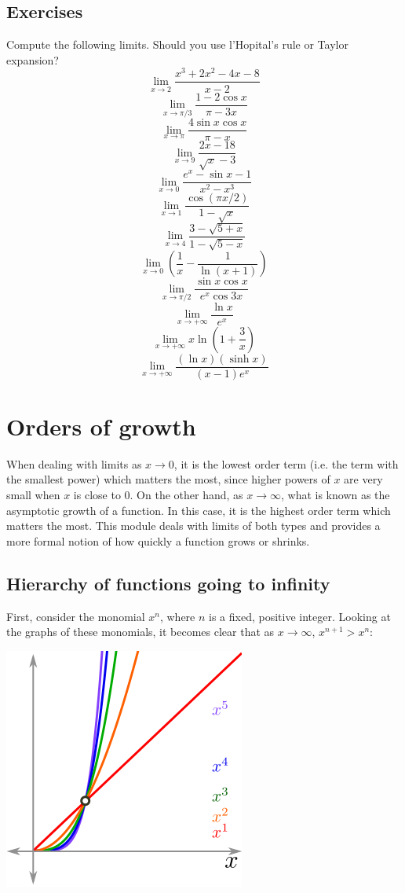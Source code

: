 \documentclass[a4paper]{book}
\begin{document}
\begin{sloppypar}
\subsection{Exercises}
Compute the following limits. Should you use l'Hopital's rule or Taylor expansion?
\[\displaystyle \lim_{x \to 2} \frac{x^3+2x^2-4x-8}{x-2} \]
\[\displaystyle \lim_{x \to \pi/3} \frac{1-2\cos x}{\pi -3x} \]
\[\displaystyle \lim_{x \to \pi} \frac{4 \sin x \cos x}{\pi - x} \]
\[\displaystyle \lim_{x \to 9} \frac{2x-18}{\sqrt{x}-3} \]
\[\displaystyle \lim_{x \to 0} \frac{e^x - \sin x -1}{x^2-x^3} \]
\[\displaystyle \lim_{x \to 1} \frac{\cos (\pi x/2)}{1 - \sqrt{x}} \]
\[\displaystyle \lim_{x \to 4} \frac{3 - \sqrt{5+x}}{1 - \sqrt{5-x}} \]
\[\displaystyle \lim_{x\rightarrow 0} \left(\frac{1}{x}-\frac{1}{\ln (x+1)}\right) \]
\[\displaystyle \lim_{x \to \pi/2} \frac{\sin x \cos x}{e^x\cos 3x} \]
\[\displaystyle \lim_{x \rightarrow +\infty} \frac {\ln x}{e^x} \]
\[\displaystyle \lim_{x \to +\infty} x \ln\left(1+ \frac{3}{x}\right) \]
\[\displaystyle \lim_{x \to +\infty} \frac{(\ln x)(\sinh x)}{(x-1)e^x} \]

\section{Orders of growth} \label{ChFunctionsSecOrdersOfGrowth}
When dealing with limits as $x\rightarrow 0$, it is the lowest order term (i.e. the term with the smallest power) which matters the most, since higher powers of $x$ are very small when $x$ is close to 0. On the other hand, as $x \rightarrow \infty$, what is known as the asymptotic growth of a function. In this case, it is the highest order term which matters the most. This module deals with limits of both types and provides a more formal notion of how quickly a function grows or shrinks.

\subsection{Hierarchy of functions going to infinity}
First, consider the monomial $x^n$, where $n$ is a fixed, positive integer. Looking at the graphs of these monomials, it becomes clear that as $x \rightarrow \infty$, $x^{n+1} > x^n$:

\begin{center}\includegraphics[scale=0.6]{AsymptoticMonomial}\end{center}


\end{sloppypar}
\end{document}

